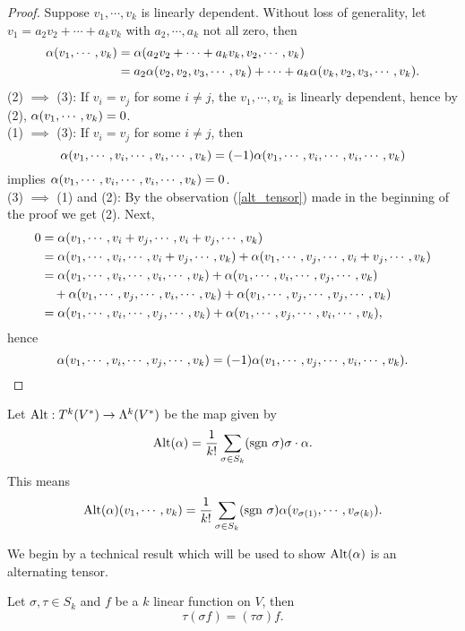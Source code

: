 \begin{proof}
    Suppose $v_1, \cdots, v_k$ is linearly dependent. Without loss of generality, let $v_1 = a_2v_2 + \cdots + a_kv_k$ with $a_2,\cdots,a_k$ not all zero, then 
    \begin{align}\label{alt_tensor}
    \alpha(v_1,\cdots,v_k)
    &= \alpha(a_2v_2 + \cdots + a_kv_k, v_2,\cdots,v_k) \\
    &= a_2 \alpha(v_2,v_2,v_3,\cdots,v_k) + \cdots + a_k \alpha(v_k,v_2,v_3,\cdots,v_k).  
    \end{align}
    (2) $\implies$ (3): If $v_i = v_j$ for some $i \neq j$, the $v_1,\cdots,v_k$ is linearly dependent, hence by (2), $\alpha(v_1,\cdots,v_k)=0$. \\
    (1) $\implies$ (3): If $v_i = v_j$ for some $i \neq j$, then 
    $$\alpha(v_1, \cdots, v_i, \cdots, v_i, \cdots, v_k) = (-1)\alpha(v_1, \cdots, v_i, \cdots, v_i, \cdots, v_k)$$ implies $\alpha(v_1, \cdots, v_i, \cdots, v_i, \cdots, v_k) = 0$. \\
    (3) $\implies$ (1) and (2): By the observation (\ref{alt_tensor}) made in the beginning of the proof we get (2). Next,
    \begin{align*}
    0 &= \alpha(v_1,\cdots,v_i+v_j,\cdots,v_i+v_j,\cdots,v_k) \\
    &= \alpha(v_1,\cdots,v_i,\cdots,v_i+v_j,\cdots,v_k) + 
       \alpha(v_1,\cdots,v_j,\cdots,v_i+v_j,\cdots,v_k) \\
    &= \alpha(v_1,\cdots,v_i,\cdots,v_i,\cdots,v_k) + 
       \alpha(v_1,\cdots,v_i,\cdots,v_j,\cdots,v_k) \\
    &\quad+ \alpha(v_1,\cdots,v_j,\cdots,v_i,\cdots,v_k) +
       \alpha(v_1,\cdots,v_j,\cdots,v_j,\cdots,v_k) \\
    &= \alpha(v_1,\cdots,v_i,\cdots,v_j,\cdots,v_k) + 
       \alpha(v_1,\cdots,v_j,\cdots,v_i,\cdots,v_k),
    \end{align*}
    hence 
    $$\alpha(v_1,\cdots,v_i,\cdots,v_j,\cdots,v_k) = (-1)
      \alpha(v_1,\cdots,v_j,\cdots,v_i,\cdots,v_k). $$
\end{proof}
\begin{definition}
    Let $\mathrm{Alt}: T^k(V^*) \to \Lambda^k(V^*)$ be the map given by 
    $$ \mathrm{Alt}(\alpha) = \frac{1}{k!}\sum_{\sigma \in S_k}(\mathrm{sgn~} \sigma) \sigma \cdot \alpha.$$ This means
    $$\mathrm{Alt}(\alpha)(v_1,\cdots,v_k) = \frac{1}{k!}\sum_{\sigma \in S_k}(\mathrm{sgn~} \sigma) \alpha(v_{\sigma(1)}, \cdots, v_{\sigma(k)}). $$
\end{definition}
We begin by a technical result which will be used to show $\mathrm{Alt}(\alpha)$ is an alternating tensor. 
\begin{proposition}
    Let $\sigma, \tau \in S_k$ and $f$ be a $k$ linear function on $V$, then 
    $$\tau(\sigma f) = (\tau \sigma)f. $$
\end{proposition}
